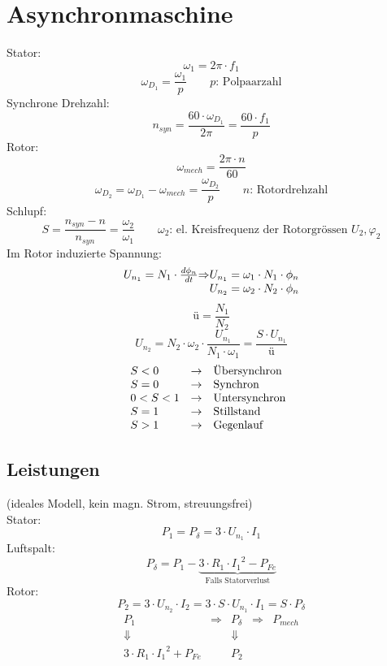 \section{Asynchronmaschine}
Stator: 
\[ \omega_1 = 2 \pi \cdot f_1 \]
\[ \omega_{D_1} = \frac{\omega_1}{p} \qquad p\text{: Polpaarzahl} \]
Synchrone Drehzahl: 
\[ n_{syn} = \frac{60 \cdot \omega_{D_1}}{2 \pi} = \frac{60 \cdot f_1}{p} \]
Rotor: 
\[ \omega_{mech} = \frac{2 \pi \cdot n}{60} \]
\[ \omega_{D_2} = \omega_{D_1} - \omega_{mech} = \frac{\omega_{D_2}}{p} 
\qquad n\text{: Rotordrehzahl} \]
Schlupf: 
\[ S = \frac{n_{syn} - n}{n_{syn}} = \frac{\omega_2}{\omega_1} 
\qquad \text{$\omega_2$: el. Kreisfrequenz der Rotorgrössen $U_2, \varphi_2$} \]
Im Rotor induzierte Spannung: 
\[ \begin{array}{@{}l@{}l@{}l@{}}
U_{n_1} = N_1 \cdot \frac{d \phi_n}{d t} & \Rightarrow 
& U_{n_1} = \omega_1 \cdot N_1 \cdot \phi_n \\
&& U_{n_2} = \omega_2 \cdot N_2 \cdot \phi_n \\
\end{array} \]
\[ ü = \frac{N_1}{N_2} \]
\[ U_{n_2} = N_2 \cdot \omega_2 \cdot \frac{U_{n_1}}{N_1 \cdot \omega_1} 
= \frac{S \cdot U_{n_1}}{ü} \]
\[ \begin{array}{@{}lll}
S < 0     & \rightarrow & \text{Übersynchron} \\
S = 0     & \rightarrow & \text{Synchron} \\
0 < S < 1 & \rightarrow & \text{Untersynchron} \\
S = 1     & \rightarrow & \text{Stillstand} \\
S > 1     & \rightarrow & \text{Gegenlauf} \\
\end{array} \]

\subsection{Leistungen}
(ideales Modell, kein magn. Strom, streuungsfrei)\\
Stator: 
\[ P_1 = P_\delta = 3 \cdot U_{n_1} \cdot I_1 \]
Luftspalt: 
\[ P_\delta = P_1 - \underbrace{3 \cdot R_1 \cdot {I_1}^2 - P_{Fe}}_
{\text{Falls Statorverlust}} \]
Rotor: 
\[ P_2 = 3 \cdot U_{n_2} \cdot I_2 
= 3 \cdot S \cdot U_{n_1} \cdot I_1 = S \cdot P_\delta \]
\[ \begin{array}{ccccc}
P_1 & \Rightarrow &  P_\delta & \Rightarrow & P_{mech} \\
\Downarrow & & \Downarrow & & \\
3 \cdot R_1 \cdot {I_1}^2 + P_{Fe} & & P_2 & \\
\end{array} \]

